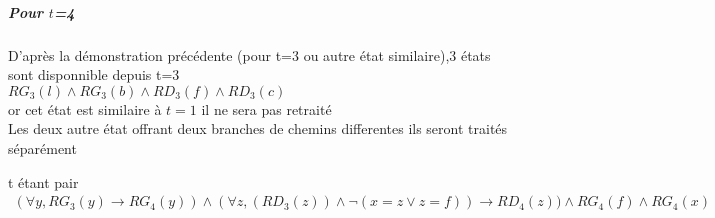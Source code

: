 \documentclass{article}
\begin{document}
\newpage
\subparagraph*{Pour $t$=4}
D'après la démonstration précédente (pour t=3 ou autre état similaire),3 états sont disponnible depuis t=3\\

$RG_3(l) \wedge RG_3(b) \wedge RD_3(f) \wedge RD_3(c)$\\
or cet état est similaire à $t=1$ il ne sera pas retraité\\
Les deux autre état offrant deux branches de chemins differentes ils seront traités séparément

t étant pair
\begin{align*}
    (\forall y, RG_{3}(y) \to RG_{4}(y)) \wedge (\forall z,(RD_{3}(z)) \wedge \neg(x=z \vee z=f)) \rightarrow RD_{4}(z)) \wedge RG_4(f) \wedge RG_4(x)
\end{align*}
\end{document}
